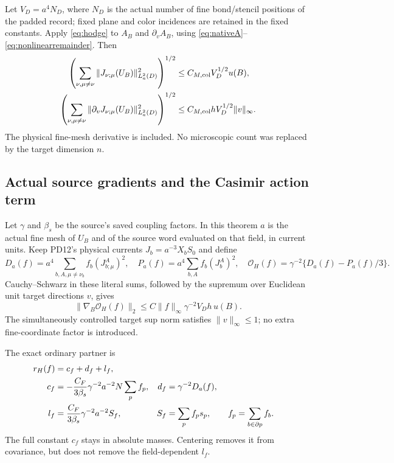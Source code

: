 \documentclass[11pt,letterpaper]{article}
\numberwithin{equation}{section}
\theoremstyle{plain}
\theoremstyle{remark}
\newcommand{\OH}{\mathcal O_H}
\begin{document}
Let $V_D=a^4N_D$, where $N_D$ is the actual number of fine bond/stencil
positions of the padded record; fixed plane and color incidences are retained
in the fixed constants. Apply \eqref{eq:hodge} to $A_B$ and $\partial_vA_B$,
using \eqref{eq:nativeA}--\eqref{eq:nonlinearremainder}. Then
\begin{align}
 \left(\sum_{\nu,\mu\ne\nu}\|J_{\nu;\mu}(U_B)\|_{L^2_a(D)}^2\right)^{1/2}
 &\le C_{M,\rm col}V_D^{1/2}u(B),\label{eq:dir1}\\
 \left(\sum_{\nu,\mu\ne\nu}\|\partial_vJ_{\nu;\mu}(U_B)\|_{L^2_a(D)}^2\right)^{1/2}
 &\le C_{M,\rm col}hV_D^{1/2}\|v\|_\infty.
 \label{eq:dir2}
\end{align}
The physical fine-mesh derivative is included. No microscopic count was
replaced by the target dimension $n$.

\subsection{Actual source gradients and the Casimir action term}

Let $\gamma$ and $\beta_s$ be the source's saved coupling factors. In this
theorem $a$ is the actual fine mesh of $U_B$ and of the source word evaluated
on that field, in current units. Keep PD12's physical currents
$J_b=a^{-3}X_bS_0$ and define
\[
 D_a(f)=a^4\sum_{b,A,\mu\ne\nu_b}f_b(J_{b;\mu}^A)^2,
 \quad P_a(f)=a^4\sum_{b,A}f_b(J_b^A)^2,
 \quad \OH(f)=\gamma^{-2}\{D_a(f)-P_a(f)/3\}.
\]
Cauchy--Schwarz in these literal sums, followed by the supremum over Euclidean
unit target directions $v$, gives
\begin{equation}
 \|\nabla_B\OH(f)\|_2
 \le C\|f\|_\infty\gamma^{-2}V_Dh\,u(B).
 \label{eq:gradH}
\end{equation}
The simultaneously controlled target sup norm satisfies $\|v\|_\infty\le1$;
no extra fine-coordinate factor is introduced.

The exact ordinary partner is
\begin{align}
 r_H(f)&=c_f+d_f+l_f,\label{eq:rowdecomp}\\
 c_f&=-\frac{C_F}{3\beta_s}\gamma^{-2}a^{-2}N\sum_pf_p,
 &d_f&=\gamma^{-2}D_a(f),\notag\\
 l_f&=\frac{C_F}{3\beta_s}\gamma^{-2}a^{-2}S_f,
 &S_f&=\sum_pf_ps_p,
 \qquad f_p=\sum_{b\in\partial p}f_b.\notag
\end{align}
The full constant $c_f$ stays in absolute masses. Centering removes it from
covariance, but does not remove the field-dependent $l_f$.
\end{document}
